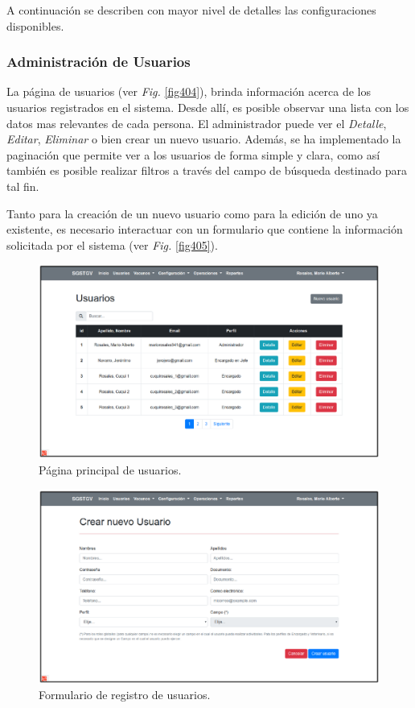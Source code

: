 \documentclass[11pt,oneside]{book}
\begin{document}
A continuación se describen con mayor nivel de detalles las configuraciones disponibles.

\subsubsection{Administración de Usuarios}
La página de usuarios (ver \textit{Fig.} \eqref{fig404}), brinda información acerca de los usuarios registrados en el sistema. Desde allí, es posible observar una lista con los datos mas relevantes de cada persona. El administrador puede ver el \textit{Detalle}, \textit{Editar}, \textit{Eliminar} o bien crear un nuevo usuario. Además, se ha implementado la paginación que permite ver a los usuarios de forma simple y clara, como así también es posible realizar filtros a través del campo de búsqueda destinado para tal fin.

Tanto para la creación de un nuevo usuario como para la edición de uno ya existente, es necesario interactuar con un formulario que contiene la información solicitada por el sistema (ver \textit{Fig.} \eqref{fig405}).

\begin{figure}[tbhp]
\centerline{\includegraphics[scale=0.87]{figs/capitulo_3_desarrollo/fig404.pdf}}
\caption{Página principal de usuarios.}
\label{fig404}
\end{figure}

\begin{figure}[tbhp]
\centerline{\includegraphics[scale=0.87]{figs/capitulo_3_desarrollo/fig405.pdf}}
\caption{Formulario de registro de usuarios.}
\label{fig405}
\end{figure}
\end{document}

